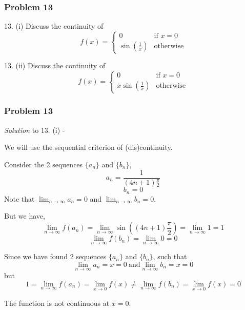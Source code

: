 \documentclass[
	11pt, %
]{beamer}
\begin{document}
\begin{frame}
	\frametitle{Problem 13}
	
	\begin{block}{13. (i)} 
		Discuss the continuity of
		\begin{equation*}
			f(x) = 
			\begin{cases}
			   0 & \text{if $x = 0$}\\
			   \sin(\frac1x) & \text{otherwise}
			\end{cases}
		\end{equation*}
	\end{block}

	\begin{block}{13. (ii)} 
		Discuss the continuity of
		\begin{equation*}
			f(x) = 
			\begin{cases}
			   0 & \text{if $x = 0$}\\
			   x \sin(\frac1x) & \text{otherwise}
			\end{cases}
		\end{equation*}
	\end{block}
	
\end{frame}

\begin{frame}[t]
	\frametitle{Problem 13}

	\textit{Solution} to 13. (i) -

	\bigskip

	We will use the sequential criterion of (dis)continuity.

	\medskip

	Consider the 2 sequences $\{a_n\}$ and $\{b_n\}$,
	\[a_n = \frac{1}{(4n+1) \frac{\pi}{2}}\]
	\[b_n = 0\]
	Note that $\lim_{n \to \infty} a_n = 0$ and $\lim_{n \to \infty} b_n = 0$.

	\medskip

	But we have,
	\[\lim_{n \to \infty} f(a_n) = \lim_{n \to \infty} \sin((4n+1)\frac{\pi}{2}) = \lim_{n \to \infty} 1 = 1\]
	\[\lim_{n \to \infty} f(b_n) = \lim_{n \to \infty} 0 = 0\]

\end{frame}

\begin{frame}[t]
	Since we have found 2 sequences $\{a_n\}$ and $\{b_n\}$, such that \[\lim_{n \to \infty} a_n = x = 0 ~ \text{and} \lim_{n \to \infty} b_n = x = 0\] but \[1 = \lim_{n \to \infty} f(a_n) = \lim_{x \to 0} f(x) \neq \lim_{n \to \infty} f(b_n) = \lim_{x \to 0} f(x) = 0\]
	
	\medskip

	The function is not continuous at $x=0$.
\end{frame}
\end{document}
